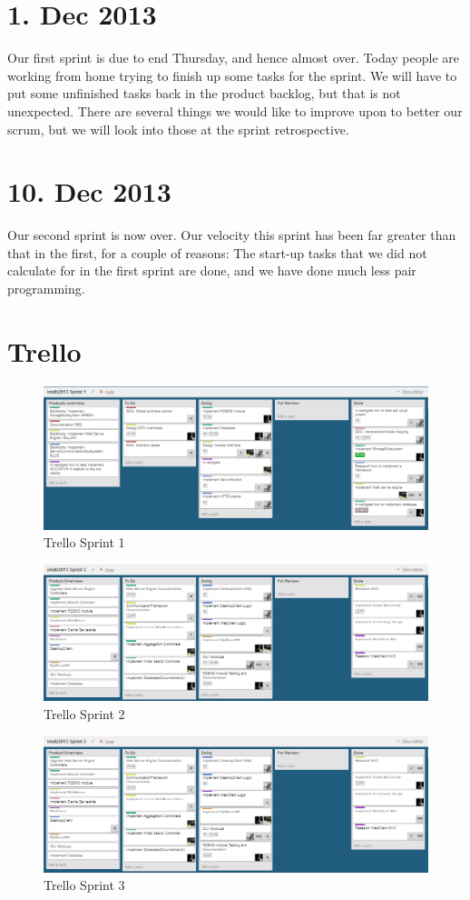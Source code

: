 \documentclass[]{report}
\begin{document}
\section{1. Dec 2013}
Our first sprint is due to end Thursday, and hence almost over. Today people are working from home trying to finish up some tasks for the sprint. We will have to put some unfinished tasks back in the product backlog, but that is not unexpected. There are several things we would like to improve upon to better our scrum, but we will look into those at the sprint retrospective.

\section{10. Dec 2013}
Our second sprint is now over. Our velocity this sprint has been far greater than that in the first, for a couple of reasons: The start-up tasks that we did not calculate for in the first sprint are done, and we have done much less pair programming.

\section{Trello}



\begin{figure}[h]
\includegraphics[scale=0.5]{img/trelloSprint1.png}
\caption{Trello Sprint 1}
\label{fig:Trello Sprint 1}
\end{figure}

\begin{figure}[h]
\includegraphics[scale=0.5]{img/trelloSprint2.png}
\caption{Trello Sprint 2}
\label{fig:Trello Sprint 2}
\end{figure}

\begin{figure}[h]
\includegraphics[scale=0.5]{img/trelloSprint2.png}
\caption{Trello Sprint 3}
\label{fig:Trello Sprint 3}
\end{figure}
\end{document}
